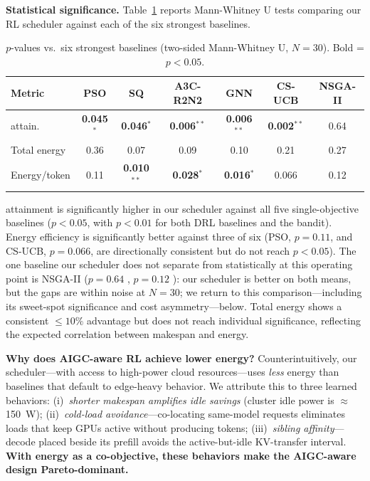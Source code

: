\textbf{Statistical significance.} Table~\ref{tab:significance}
reports Mann-Whitney U tests
comparing our RL scheduler against each of the six strongest
baselines.

\begin{table}[t]
  \centering
  \caption{$p$-values vs.\ six strongest baselines (two-sided
    Mann-Whitney U, $N{=}30$). Bold = $p<0.05$.}
  \label{tab:significance}
  \scriptsize
  \setlength{\tabcolsep}{3pt}
  \begin{tabular}{lcccccc}
    \toprule
    Metric & PSO & SQ & A3C-R2N2 & GNN & CS-UCB & NSGA-II \\
    \midrule
    \slo{} attain.   & \textbf{0.045}$^*$ & \textbf{0.046}$^*$
                     & \textbf{0.006}$^{**}$ & \textbf{0.006}$^{**}$
                     & \textbf{0.002}$^{**}$ & 0.64 \\
    Total energy     & 0.36 & 0.07 & 0.09 & 0.10 & 0.21 & 0.27 \\
    Energy/token     & 0.11 & \textbf{0.010}$^{**}$
                     & \textbf{0.028}$^*$ & \textbf{0.016}$^*$
                     & 0.066 & 0.12 \\
    \bottomrule
  \end{tabular}
\end{table}

\slo{} attainment is significantly higher in our scheduler
against all five single-objective baselines ($p<0.05$, with
$p<0.01$ for both
DRL baselines and the bandit). Energy efficiency is
significantly better
against three of six (PSO, $p=0.11$, and CS-UCB, $p=0.066$,
are directionally consistent but
do not reach $p<0.05$). The one baseline our scheduler does
not separate from statistically at this operating point is
NSGA-II ($p=0.64$ \slo, $p=0.12$ \etok): our scheduler is
better on both means, but the gaps are within noise at
$N{=}30$; we return to this comparison---including its
sweet-spot significance and cost asymmetry---below. Total
energy shows a consistent
$\le 10\%$ advantage but does not reach individual
significance, reflecting the expected correlation between
makespan and energy.

\textbf{Why does AIGC-aware RL achieve lower energy?}
Counterintuitively, our scheduler---with access to high-power
cloud resources---uses \emph{less} energy than baselines that
default to edge-heavy behavior. We attribute this to three
learned behaviors: (i)~\emph{shorter makespan amplifies idle
savings} (cluster idle power is $\approx$150~W);
(ii)~\emph{cold-load avoidance}---co-locating same-model
requests eliminates loads that keep GPUs active without
producing tokens; (iii)~\emph{sibling affinity}---decode
placed beside its prefill avoids the active-but-idle
KV-transfer interval. \textbf{With energy as a co-objective,
these behaviors make the AIGC-aware design Pareto-dominant.}

